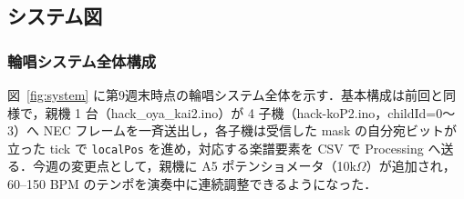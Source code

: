 \documentclass[a4paper,11pt]{ltjsarticle}
\providecommand{\％}{\%}
\begin{document}
\subsection{システム図}\label{sec:diagrams}

\subsubsection{輪唱システム全体構成}\label{sec:sysdiag}

図~\ref{fig:system} に第9週末時点の輪唱システム全体を示す．基本構成は前回と同様で，親機 1 台（hack\_oya\_kai2.ino）が 4 子機（hack-koP2.ino，childId=0〜3）へ NEC フレームを一斉送出し，各子機は受信した mask の自分宛ビットが立った tick で \texttt{localPos} を進め，対応する楽譜要素を CSV で Processing へ送る．今週の変更点として，親機に A5 ポテンショメータ（10k$\Omega$）が追加され，60--150 BPM のテンポを演奏中に連続調整できるようになった．
\end{document}
